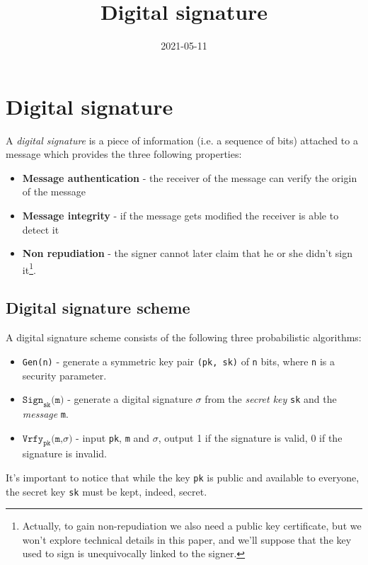 \documentclass{article}
\title{Digital signature}
\author{}
\date{2021-05-11}
\begin{document}
	\maketitle

	\section{Digital signature}

	A \emph{digital signature} is a piece of information (i.e. a sequence of
	bits) attached to a message which provides the three following properties:
	\begin{itemize}
		\item \textbf{Message authentication} - the receiver of the message can
			verify the origin of the message
		\item \textbf{Message integrity} - if the message gets modified the
			receiver is able to detect it
		\item \textbf{Non repudiation} - the signer cannot later claim that he
			or she didn't sign it\footnote{Actually, to gain non-repudiation 
			we also need a public key certificate, but we won't explore 
			technical details in this paper, and we'll suppose that the key
			used to sign is unequivocally linked to the signer.}.
	\end{itemize}

	\subsection{Digital signature scheme}

	A digital signature scheme consists of the following three probabilistic
	algorithms:

	\begin{itemize}
		\item \texttt{Gen(n)} - generate a symmetric key pair \texttt{(pk, sk)}
			of \texttt{n} bits, where \texttt{n} is a security parameter.
		\item $\texttt{Sign}_{\texttt{sk}}\texttt{(m)}$ - generate a digital
			signature $\sigma$ from the \emph{secret key} \texttt{sk} and the
			\emph{message} \texttt{m}.
		\item $\texttt{Vrfy}_{\texttt{pk}}\texttt{(m,}\sigma\texttt{)}$ - input
			\texttt{pk}, \texttt{m} and $\sigma$, output
			1 if the signature is valid, 0 if the signature is invalid.
	\end{itemize}

	It's  important to notice that while the key \texttt{pk} is public and
	available to everyone, the secret key \texttt{sk} must be kept, indeed,
	secret.
\end{document}
